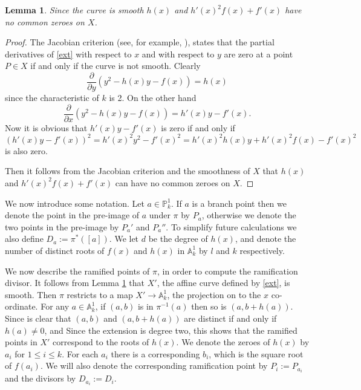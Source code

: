 \documentclass[11pt]{article} %
\theoremstyle{plain}
\newtheorem{lem}[defn]{Lemma}
\theoremstyle{remark}
\begin{document}
\begin{lem}\label{smoothness}
Since the curve is smooth $h(x)$ and $h'(x)^2 f(x) + f'(x)$ have no common zeroes on $X$.
\end{lem}
\begin{proof}
 The Jacobian criterion (see, for example, \cite[Thm. 2.19]{liu}), states that the partial derivatives of \eqref{ext} with respect to $x$ and with respect to $y$ are zero at a point $P\in X$ if and only if the curve is not smooth.
 Clearly \[
          \frac{\partial}{\partial y} (y^2 -h(x)y -f(x)) = h(x)
         \]
 since the characteristic of $k$ is 2.
 On the other hand
 \begin{equation*}\label{xderivative}
  \frac{\partial}{\partial x} (y^2 - h(x)y -f(x)) = h'(x)y - f'(x).
 \end{equation*}
Now it is obvious that $h'(x)y - f'(x)$ is zero if and only if
\[
 (h'(x)y-f'(x))^2 = h'(x)^2y^2 -f'(x)^2 = h'(x)^2h(x)y + h'(x)^2f(x) - f'(x)^2
 \]
is also zero.

 Then it follows from the Jacobian criterion and the smoothness of $X$ that $h(x)$ and $h'(x)^2f(x) + f'(x)$ can have no common zeroes on $X$. 
\end{proof}


We now introduce some notation.
Let $a\in \mathbb P_k^1$.
If $a$ is a branch point then we denote the point in the pre-image of $a$ under $\pi$ by $P_a$, otherwise we denote the two points in the pre-image by $P_a'$ and $P_a''$.
To simplify future calculations we also define $D_a := \pi^*([a])$.
We let $d$ be the degree of $h(x)$, and denote the number of distinct roots of $f(x)$ and $h(x)$ in $\mathbb A_k^1$ by $l$ and $k$ respectively.



We now describe the ramified points of $\pi$, in order to compute the ramification divisor.
It follows from Lemma \ref{smoothness} that $X'$, the affine curve defined by \eqref{ext}, is smooth.
Then $\pi$ restricts to a map $X'\rightarrow \mathbb A^1_k$, the projection on to the $x$ co-ordinate.
For any $a\in \mathbb A_k^1$, if $(a,b)$ is in $\pi^{-1}(a)$ then so is $(a,b+h(a))$.
Since is clear that $(a,b)$ and $(a,b+h(a))$ are distinct if and only if $h(a)\neq 0$, and
Since the extension is degree two, this shows that the ramified points in $X'$ correspond to the roots of $h(x)$.
We denote the zeroes of $h(x)$ by $a_i$ for $1\leq i \leq k$.
For each $a_i$ there is a corresponding $b_i$, which is the square root of $f(a_i)$.
We will also denote the corresponding ramification point by $P_i := P_{a_i}$ and the divisors by $D_{a_i}:=D_i$.
\end{document}
